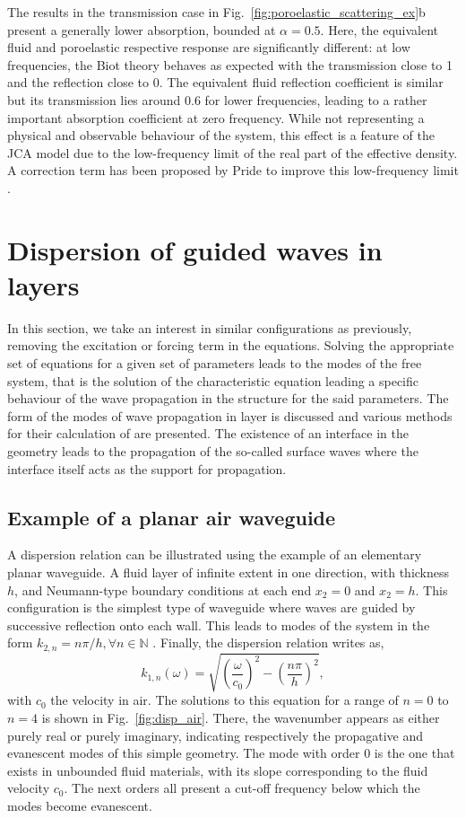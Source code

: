 The results in the transmission case in Fig.~\ref{fig:poroelastic_scattering_ex}b present a generally lower absorption, bounded at $\alpha = 0.5$. Here, the equivalent fluid and poroelastic respective response are significantly different: at low frequencies, the Biot theory behaves as expected with the transmission close to 1 and the reflection close to 0. The equivalent fluid reflection coefficient is similar but its transmission lies around 0.6 for lower frequencies, leading to a rather important absorption coefficient at zero frequency. While not representing a physical and observable behaviour of the system, this effect is a feature of the JCA model due to the low-frequency limit of the real part of the effective density. A correction term has been proposed by Pride \etal \cite{pride1993} to improve this low-frequency limit \cite{allard2009}.

\section{Dispersion of guided waves in layers}
\label{sec:chap1_guidedwaves}
In this section, we take an interest in similar configurations as previously, removing the excitation or forcing term in the equations.  Solving the appropriate set of equations for a given set of parameters leads to the modes of the free system, that is the solution of the characteristic equation leading a specific behaviour of the wave propagation in the structure for the said parameters. The form of the modes of wave propagation in layer is discussed and various methods for their calculation of are presented. The existence of an interface in the geometry leads to the propagation of the so-called surface waves \cite{auld1973} where the interface itself acts as the support for propagation. 

\subsection{Example of a planar air waveguide}
A dispersion relation can be illustrated using the example of an elementary planar waveguide. A fluid layer of infinite extent in one direction, with thickness $h$, and Neumann-type boundary conditions at each end $x_2 = 0$ and $x_2 = h$. This configuration is the simplest type of waveguide where waves are guided by successive reflection onto each wall. This leads to modes of the system in the form $k_{2,n} = n\pi/h, \forall n \in \mathbb N$ \cite{bruneau2006,royer2021}. Finally, the dispersion relation writes as,
\begin{equation}
    k_{1,n}(\omega) = \sqrt{\left(\frac{\omega}{c_0}\right)^2 - \left(\frac{n \pi}{h}\right)^2},
\end{equation}
with $c_0$ the velocity in air. The solutions to this equation for a range of $n=0$ to $n=4$ is shown in Fig.~\ref{fig:disp_air}. There, the wavenumber appears as either purely real or purely imaginary, indicating respectively the propagative and evanescent modes of this simple geometry. The mode with order 0 is the one that exists in unbounded fluid materials, with its slope corresponding to the fluid velocity $c_0$. The next orders all present a cut-off frequency below which the modes become evanescent.


